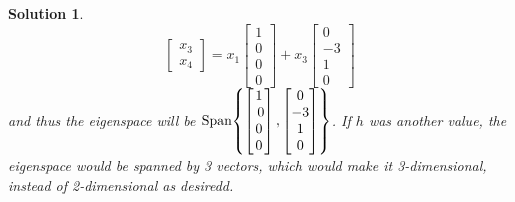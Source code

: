 \documentclass[11pt]{scrartcl}
\theoremstyle{dotlessP}
\newtheorem{sol}{Solution}[section]
\theoremstyle{dotlessN}
\DeclarePairedDelimiter\set{\{}{\}}
\newcommand{\spa}[1]{\text{Span}\set*{#1}}
\begin{document}
\begin{sol}
\[\begin{bmatrix}
	x_3 \\
	x_4
	\end{bmatrix} = 
	x_1
	\begin{bmatrix}
		1 \\
		0 \\
		0 \\
		0 
	\end{bmatrix} +
	x_3
	\begin{bmatrix}
		0 \\
		-3 \\
		1 \\
		0
	\end{bmatrix}
	\]
	and thus the eigenspace will be $
	\spa{
		\begin{bmatrix}
			1 \\\;
			0 \\
			0 \\
			0 
		\end{bmatrix},
		\begin{bmatrix}
			0 \\
			-3 \\
			1 \\
			0
		\end{bmatrix}
	}
	$. If $h$ was another value, the eigenspace would be spanned by 3 vectors, which would make it 3-dimensional, instead of 2-dimensional as desiredd.
\end{sol}
\end{document}
